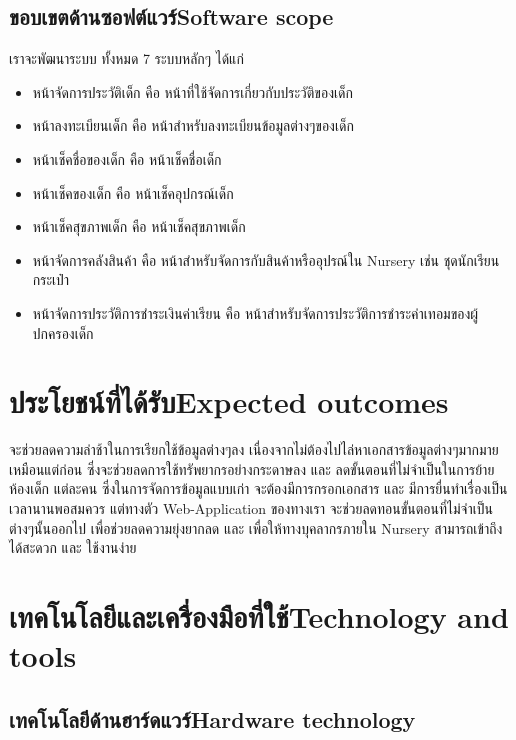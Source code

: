 \subsection{\ifcpe ขอบเขตด้านซอฟต์แวร์\else Software scope\fi}
    เราจะพัฒนาระบบ ทั้งหมด 7 ระบบหลักๆ ได้แก่
    \begin{itemize}
        \item หน้าจัดการประวัติเด็ก คือ หน้าที่ใช้จัดการเกี่ยวกับประวัติของเด็ก
        \item หน้าลงทะเบียนเด็ก คือ หน้าสำหรับลงทะเบียนข้อมูลต่างๆของเด็ก
        \item หน้าเช็คชื่อของเด็ก คือ หน้าเช็คชื่อเด็ก
        \item หน้าเช็คของเด็ก คือ หน้าเช็คอุปกรณ์เด็ก
        \item หน้าเช็คสุขภาพเด็ก คือ หน้าเช็คสุขภาพเด็ก
        \item หน้าจัดการคลังสินค้า คือ หน้าสำหรับจัดการกับสินค้าหรืออุปรณ์ใน Nursery เช่น ชุดนักเรียน กระเป๋า 
        \item หน้าจัดการประวัติการชำระเงินค่าเรียน คือ หน้าสำหรับจัดการประวัติการชำระค่าเทอมของผู้ปกครองเด็ก
    \end{itemize}

\section{\ifcpe ประโยชน์ที่ได้รับ\else Expected outcomes\fi}
จะช่วยลดความล่าช้าในการเรียกใช้ข้อมูลต่างๆลง    
  เนื่องจากไม่ต้องไปไล่หาเอกสารข้อมูลต่างๆมากมาย  เหมือนแต่ก่อน ซึ่งจะช่วยลดการใช้ทรัพยากรอย่างกระดาษลง และ 
ลดขั้นตอนที่ไม่จำเป็นในการย้ายห้องเด็ก  แต่ละคน   ซึ่งในการจัดการข้อมูลแบบเก่า  จะต้องมีการกรอกเอกสาร และ มีการยื่นทำเรื่องเป็นเวลานานพอสมควร แต่ทางตัว Web-Application ของทางเรา  จะช่วยลดทอนขั้นตอนที่ไม่จำเป็นต่างๆนั้นออกไป  เพื่อช่วยลดความยุ่งยากลด และ เพื่อให้ทางบุคลากรภายใน Nursery สามารถเข้าถึงได้สะดวก และ ใช้งานง่าย

\section{\ifcpe เทคโนโลยีและเครื่องมือที่ใช้\else Technology and tools\fi}

\subsection{\ifcpe เทคโนโลยีด้านฮาร์ดแวร์\else Hardware technology\fi}


